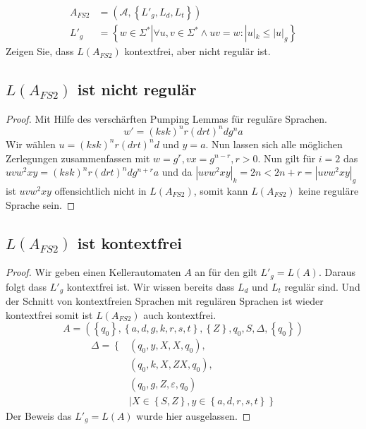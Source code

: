 \documentclass[]{article}
\begin{document}
\begin{align*}
A_{FS2}&=(\mathcal{A},\left\lbrace L'_g,L_d,L_t\right\rbrace )\\
L'_g&=\left\lbrace w\in\Sigma^*|\forall u,v\in\Sigma^* \wedge uv=w:|u|_k\leq|u|_g\right\rbrace \end{align*}
Zeigen Sie, dass $L(A_{FS2})$ kontextfrei, aber nicht regul\"ar ist.\\
\subsection{$L(A_{FS2})$ ist nicht regul\"ar}
\begin{proof}Mit Hilfe des versch\"arften Pumping Lemmas f\"ur regul\"are Sprachen.
$$w'=(ksk)^nr(drt)^ndg^na$$
Wir w\"ahlen $u=(ksk)^nr(drt)^nd$ und $y=a$. Nun lassen sich alle m\"oglichen Zerlegungen zusammenfassen mit $w=g^r,vx=g^{n-r},r>0$. Nun gilt f\"ur $i=2$ das $uvw^2xy=(ksk)^nr(drt)^ndg^{n+r}a$ und da $|uvw^2xy|_k=2n<2n+r=|uvw^2xy|_g$ ist $uvw^2xy$ offensichtlich nicht in $L(A_{FS2})$, somit kann $L(A_{FS2})$ keine regul\"are Sprache sein.
\end{proof}
\subsection{$L(A_{FS2})$ ist kontextfrei}
\begin{proof}
Wir geben einen Kellerautomaten $A$ an f\"ur den gilt $L'_g=L(A)$. Daraus folgt dass $L'_g$ kontextfrei ist. Wir wissen bereits dass $L_d$ und $L_t$ regul\"ar sind. Und der Schnitt von kontextfreien Sprachen mit regul\"aren Sprachen ist wieder kontextfrei somit ist $L(A_{FS2})$ auch kontextfrei.
$$A=(\left\lbrace q_0\right\rbrace ,\left\lbrace a,d,g,k,r,s,t\right\rbrace,\left\lbrace Z\right\rbrace ,q_0,S,\Delta ,\left\lbrace q_0\right\rbrace)$$
\begin{align*}
\Delta =\left\lbrace\right.
&(q_0,y,X,X,q_0),\\
&(q_0,k,X,ZX,q_0),\\
&(q_0,g,Z,\varepsilon,q_0)\\&|X\in\left\lbrace S,Z \right\rbrace,y\in\left\lbrace a,d,r,s,t\right\rbrace  \left. \right\rbrace 
\end{align*}
Der Beweis das $L'_g=L(A)$ wurde hier ausgelassen.
\end{proof}
\end{document}

